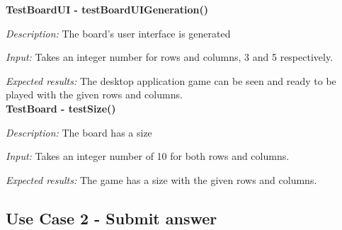 \documentclass[12pt]{article}
\begin{document}
\textbf{TestBoardUI - testBoardUIGeneration()} 
    
\textit{Description:} \newline
The board's user interface is generated \newline

\textit{Input:} \newline
Takes an integer number for rows and columns, 3 and 5 respectively. \newline 

\textit{Expected results:} \newline
The desktop application game can be seen and ready to be played with the given rows and columns. \newline
\\

\textbf{TestBoard - testSize()} 
    
\textit{Description:} \newline
The board has a size \newline

\textit{Input:} \newline
Takes an integer number of 10 for both rows and columns. \newline 

\textit{Expected results:} \newline
The game has a size with the given rows and columns. \newline
\\

\newpage


\subsection{Use Case 2 - Submit answer}
\end{document}

